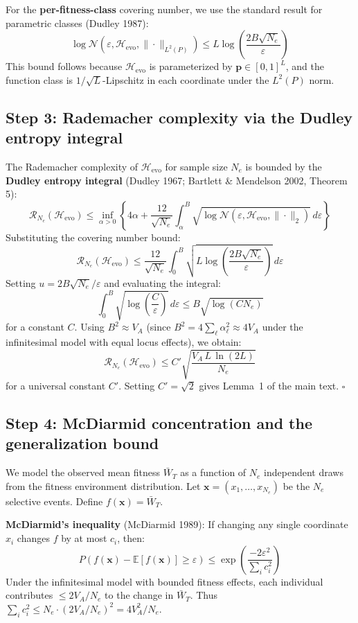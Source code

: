 \documentclass[12pt]{article}
\theoremstyle{remark}
\begin{document}
For the \textbf{per-fitness-class} covering number, we use the standard result for parametric classes (Dudley 1987):
\[
  \log \mathcal{N}\!\left(\varepsilon, \mathcal{H}_\text{evo}, \|\cdot\|_{L^2(P)}\right)
  \leq L \log\!\left(\frac{2B\sqrt{N_e}}{\varepsilon}\right)
\]
This bound follows because $\mathcal{H}_\text{evo}$ is parameterized by $\mathbf{p} \in [0,1]^L$, and the function class is $1/\sqrt{L}$-Lipschitz in each coordinate under the $L^2(P)$ norm.

\subsection{Step 3: Rademacher complexity via the Dudley entropy integral}

The Rademacher complexity of $\mathcal{H}_\text{evo}$ for sample size $N_e$ is bounded by the \textbf{Dudley entropy integral} (Dudley 1967; Bartlett \& Mendelson 2002, Theorem 5):
\[
  \mathcal{R}_{N_e}(\mathcal{H}_\text{evo})
  \leq \inf_{\alpha > 0}\left\{4\alpha
  + \frac{12}{\sqrt{N_e}}\int_\alpha^B \sqrt{\log \mathcal{N}(\varepsilon, \mathcal{H}_\text{evo}, \|\cdot\|_2)}\,d\varepsilon\right\}
\]
Substituting the covering number bound:
\[
  \mathcal{R}_{N_e}(\mathcal{H}_\text{evo})
  \leq \frac{12}{\sqrt{N_e}}\int_0^B \sqrt{L\log\!\left(\frac{2B\sqrt{N_e}}{\varepsilon}\right)}\,d\varepsilon
\]
Setting $u = 2B\sqrt{N_e}/\varepsilon$ and evaluating the integral:
\[
  \int_0^B \sqrt{\log\!\left(\frac{C}{\varepsilon}\right)}\,d\varepsilon \leq B\sqrt{\log(CN_e)}
\]
for a constant $C$. Using $B^2 \approx V_A$ (since $B^2 = 4\sum_\ell \alpha_\ell^2 \approx 4V_A$ under the infinitesimal model with equal locus effects), we obtain:
\[
  \mathcal{R}_{N_e}(\mathcal{H}_\text{evo}) \leq C'\sqrt{\frac{V_A\, L\,\ln(2L)}{N_e}}
\]
for a universal constant $C'$. Setting $C' = \sqrt{2}$ gives Lemma~1 of the main text. $\square$

\subsection{Step 4: McDiarmid concentration and the generalization bound}

We model the observed mean fitness $\bar{W}_T$ as a function of $N_e$ independent draws from the fitness environment distribution. Let $\mathbf{x} = (x_1, \ldots, x_{N_e})$ be the $N_e$ selective events. Define $f(\mathbf{x}) = \bar{W}_T$.

\textbf{McDiarmid's inequality} (McDiarmid 1989): If changing any single coordinate $x_i$ changes $f$ by at most $c_i$, then:
\[
  P(f(\mathbf{x}) - \mathbb{E}[f(\mathbf{x})] \geq \varepsilon)
  \leq \exp\!\left(\frac{-2\varepsilon^2}{\sum_i c_i^2}\right)
\]
Under the infinitesimal model with bounded fitness effects, each individual contributes $\leq 2V_A/N_e$ to the change in $\bar{W}_T$. Thus $\sum_i c_i^2 \leq N_e \cdot (2V_A/N_e)^2 = 4V_A^2/N_e$.
\end{document}
